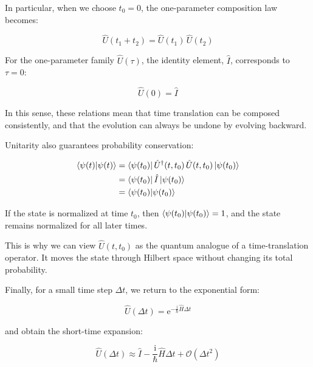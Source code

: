 In particular, when we choose $t_0=0$, the one-parameter composition law becomes:

\begin{equation}
    \hat{U}(t_1+t_2)=\hat{U}(t_1)\,\hat{U}(t_2)
\label{time_evolution_group_property}
\end{equation}

For the one-parameter family $\hat{U}(\tau)$, the identity element, $\hat{I}$, corresponds to $\tau=0$:

\begin{equation}
    \hat{U}(0)=\hat{I}
\label{time_evolution_identity}
\end{equation}

In this sense, these relations mean that time translation can be composed consistently, and that the evolution can always be undone by evolving backward.

Unitarity also guarantees probability conservation:

\begin{equation}
\begin{aligned}
    \braket{\psi(t)|\psi(t)}
    &= \bra{\psi(t_0)}\hat{U}^{\dagger}(t,t_0)\,\hat{U}(t,t_0)\ket{\psi(t_0)} \\
    &= \bra{\psi(t_0)}\hat{I}\ket{\psi(t_0)} \\
    &= \braket{\psi(t_0)|\psi(t_0)}
\end{aligned}
\label{time_evolution_norm_conservation}
\end{equation}

If the state is normalized at time $t_0$, then $\braket{\psi(t_0)|\psi(t_0)}=1$, and the state remains normalized for all later times.

This is why we can view $\hat{U}(t,t_0)$ as the quantum analogue of a time-translation operator.
It moves the state through Hilbert space without changing its total probability.

Finally, for a small time step $\Delta t$, we return to the exponential form:

\begin{equation}
    \hat{U}(\Delta t)=\mathrm{e}^{-\frac{\mathrm{i}}{\hbar}\hat{H}\Delta t}
\label{time_evolution_short_time_exact}
\end{equation}

and obtain the short-time expansion:

\begin{equation}
    \hat{U}(\Delta t)\approx \hat{I}-\frac{\mathrm{i}}{\hbar}\hat{H}\Delta t+\mathcal{O}(\Delta t^2)
\label{time_evolution_short_time_series}
\end{equation}

